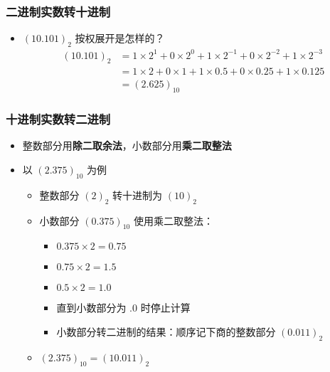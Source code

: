 \begin{frame}[fragile]
    \frametitle{二进制实数转十进制}

    \begin{itemize}[<+->]
        \item $(10.101)_2$ 按权展开是怎样的？
        \begin{align*}
        (10.101)_2 &= 1 \times 2^1 + 0 \times 2^0 + 1 \times 2^{-1} + 0 \times 2^{-2} + 1 \times 2^{-3} \\
                   &= 1 \times 2 + 0 \times 1 + 1 \times 0.5 + 0 \times 0.25 + 1 \times 0.125 \\
                   &= (2.625)_{10}
        \end{align*}
    \end{itemize}

\end{frame}

\begin{frame}[fragile]
    \frametitle{十进制实数转二进制}

    \begin{itemize}[<+->]
        \item 整数部分用\textbf{除二取余法}，小数部分用\textbf{乘二取整法}
        \item 以 $(2.375)_{10}$ 为例
        \begin{itemize}
            \item 整数部分 $(2)_2$ 转十进制为 $(10)_2$
            \item 小数部分 $(0.375)_{10}$ 使用乘二取整法：
            \begin{itemize}
                \item $0.375 \times 2 = 0.75$
                \item $0.75 \times 2 = 1.5$
                \item $0.5 \times 2 = 1.0$
                \item 直到小数部分为 $.0$ 时停止计算
                \item 小数部分转二进制的结果：顺序记下商的整数部分 $(0.011)_2$
            \end{itemize}
            \item $(2.375)_{10} = (10.011)_2$
        \end{itemize}
    \end{itemize}

\end{frame}

